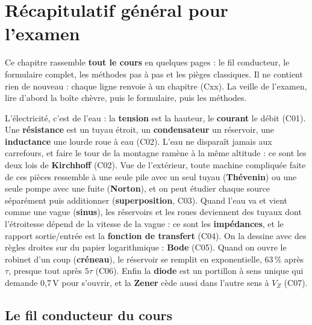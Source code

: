 \chapter{Récapitulatif général pour l'examen}

\begin{rembox}[title=Comment utiliser ce chapitre]
Ce chapitre rassemble \textbf{tout le cours} en quelques pages : le fil conducteur, le
formulaire complet, les méthodes pas à pas et les pièges classiques. Il ne contient rien de
nouveau : chaque ligne renvoie à un chapitre (Cxx). La veille de l'examen, lire d'abord la
boîte \og chèvre\fg{}, puis le formulaire, puis les méthodes.
\end{rembox}

\begin{goatbox}[title=Tout le cours expliqué à une chèvre]
L'électricité, c'est de l'eau : la \textbf{tension} est la hauteur, le \textbf{courant} le
débit (C01). Une \textbf{résistance} est un tuyau étroit, un \textbf{condensateur} un
réservoir, une \textbf{inductance} une lourde roue à eau (C02). L'eau ne disparaît jamais aux
carrefours, et faire le tour de la montagne ramène à la même altitude : ce sont les deux lois
de \textbf{Kirchhoff} (C02). Vue de l'extérieur, toute machine compliquée faite de ces pièces
ressemble à une seule pile avec un seul tuyau (\textbf{Thévenin}) ou une seule pompe avec une
fuite (\textbf{Norton}), et on peut étudier chaque source séparément puis additionner
(\textbf{superposition}, C03). Quand l'eau va et vient comme une vague (\textbf{sinus}), les
réservoirs et les roues deviennent des \og tuyaux\fg{} dont l'étroitesse dépend de la vitesse
de la vague : ce sont les \textbf{impédances}, et le rapport sortie/entrée est la
\textbf{fonction de transfert} (C04). On la dessine avec des règles droites sur du papier
logarithmique : \textbf{Bode} (C05). Quand on ouvre le robinet d'un coup (\textbf{créneau}),
le réservoir se remplit en exponentielle, 63\,\% après $\tau$, presque tout après $5\tau$
(C06). Enfin la \textbf{diode} est un portillon à sens unique qui demande 0,7\,V pour
s'ouvrir, et la \textbf{Zener} cède aussi dans l'autre sens à $V_Z$ (C07).
\end{goatbox}

\section{Le fil conducteur du cours}

